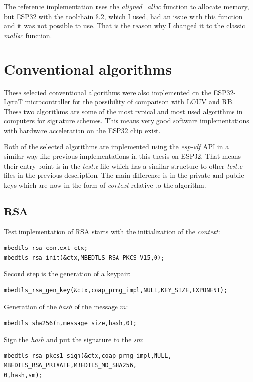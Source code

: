 \documentclass[thesis=M,english]{FITthesis}[2019/12/23]
\begin{document}
\bigskip
\noindent
The reference implementation uses the \textit{aligned\_alloc} function to allocate memory, but ESP32 with the toolchain 8.2, which I used, had an issue with this function and it was not possible to use. That is the reason why I changed it to the classic \textit{malloc} function.

\newpage
\section{Conventional algorithms}
These selected conventional algorithms were also implemented on the ESP32-LyraT microcontroller for the possibility of comparison with LOUV and RB. These two algorithms are some of the most typical and most used algorithms in computers for signature schemes. This means very good software implementations with hardware acceleration on the ESP32 chip exist. 

\bigskip
\noindent
Both of the selected algorithms are implemented using the \textit{esp-idf} API in a similar way like previous implementations in this thesis on ESP32. That means their entry point is in the \textit{test.c} file which has a similar structure to other \textit{test.c} files in the previous description. The main difference is in the private and public keys which are now in the form of \textit{context} relative to the algorithm.

\subsection{RSA}
Test implementation of RSA starts with the initialization of the \textit{context}:
\begin{lstlisting}[frame=single]
mbedtls_rsa_context ctx;
mbedtls_rsa_init(&ctx,MBEDTLS_RSA_PKCS_V15,0);
\end{lstlisting}

\noindent
Second step is the generation of a keypair:
\begin{lstlisting}[frame=single]
mbedtls_rsa_gen_key(&ctx,coap_prng_impl,NULL,KEY_SIZE,EXPONENT);
\end{lstlisting}

\noindent
Generation of the \textit{hash} of the message $m$:
\begin{lstlisting}[frame=single]
mbedtls_sha256(m,message_size,hash,0);
\end{lstlisting}

\noindent
Sign the \textit{hash} and put the signature to the \textit{sm}:
\begin{lstlisting}[frame=single]
mbedtls_rsa_pkcs1_sign(&ctx,coap_prng_impl,NULL,
MBEDTLS_RSA_PRIVATE,MBEDTLS_MD_SHA256,
0,hash,sm);
\end{lstlisting}
\end{document}
